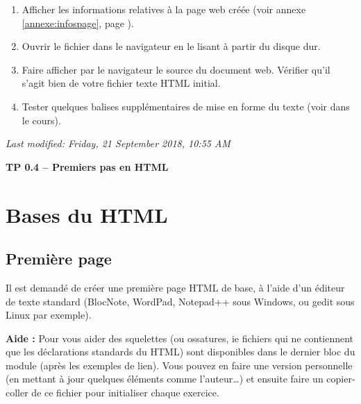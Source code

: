 \documentclass[11pt]{article}
\begin{document}
\begin{afaire}
\begin{enumerate}
    Première ligne du paragraphe.\\
    Seconde ligne du paragraphe.

    Le HTML5 est encore un langage \textbf{d'avenir}.

    \item Afficher les informations relatives à la page web créée
    (voir annexe \ref{annexe:infospage}, page \pageref{annexe:infospage}).
    \item Ouvrir le fichier dans le navigateur en le lisant à partir du disque dur.
    \item Faire afficher par le navigateur le source du document web. Vérifier qu'il s'agit bien de votre fichier texte HTML initial.
    \item Tester quelques balises supplémentaires de mise en forme du texte (voir dans le cours).
\end{enumerate}
\end{afaire}

\vspace{1em}
\noindent\textit{Last modified: Friday, 21 September 2018, 10:55 AM}

\newpage
{}

{\Large\bfseries TP 0.4 -- Premiers pas en HTML}

\bigskip

\section{Bases du HTML}

\subsection{Première page}

Il est demandé de créer une première page HTML de base, à l'aide d'un éditeur de texte standard (BlocNote, WordPad, Notepad++ sous Windows, ou gedit sous Linux par exemple).

\textcolor{rougetitre}{\textbf{Aide :}} Pour vous aider des squelettes (ou ossatures, ie fichiers qui ne contiennent que les déclarations standards du HTML) sont disponibles dans le dernier bloc du module (après les exemples de lien). Vous pouvez en faire une version personnelle (en mettant à jour quelques éléments comme l'auteur\ldots) et ensuite faire un copier-coller de ce fichier pour initialiser chaque exercice.
\end{document}
